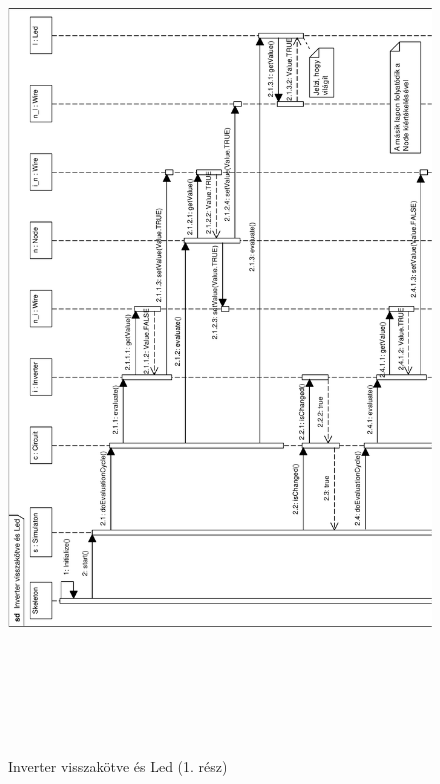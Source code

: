 \begin{figure}[H]
\begin{center}
\includegraphics[height=23cm]{chapters/chapter05/imgs/test4-1.pdf}
\caption{Inverter visszakötve és Led (1. rész)}
\label{fig:init}
\end{center}
\end{figure}

